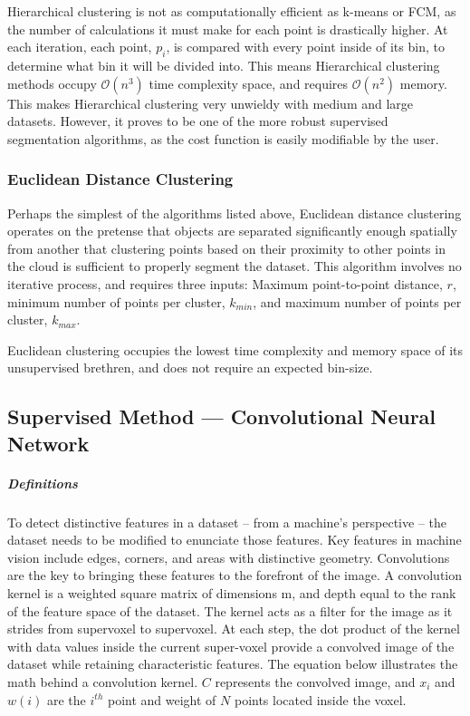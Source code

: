 \documentclass[12pt]{drexelthesis}
\let\Oldsubsection\subsection
\renewcommand{\subsection}{\FloatBarrier\Oldsubsection}
\let\Oldsubsubsection\subsubsection
\renewcommand{\subsubsection}{\FloatBarrier\Oldsubsubsection}
\begin{document}
Hierarchical clustering is not as computationally efficient as k-means or FCM, as the number of calculations it must make for each point is drastically higher. At each iteration, each point, $p_{i}$, is compared with every point inside of its bin, to determine what bin it will be divided into. This means Hierarchical clustering methods occupy $\mathcal{O}(n^{3})$ time complexity space, and requires $\mathcal{O}(n^{2})$ memory. This makes Hierarchical clustering very unwieldy with medium and large datasets. However, it proves to be one of the more robust supervised segmentation algorithms, as the cost function is easily modifiable by the user.


\subsubsection{Euclidean Distance Clustering}
Perhaps the simplest of the algorithms listed above, Euclidean distance clustering operates on the pretense that objects are separated significantly enough spatially from another that clustering points based on their proximity to other points in the cloud is sufficient to properly segment the dataset. This algorithm involves no iterative process, and requires three inputs: Maximum point-to-point distance, $r$, minimum number of points per cluster, $k_{min}$, and maximum number of points per cluster, $k_{max}$.

Euclidean clustering occupies the lowest time complexity and memory space of its unsupervised brethren, and does not require an expected bin-size.



\subsection{Supervised Method --- Convolutional Neural Network}
\subparagraph{Definitions}
To detect distinctive features in a dataset – from a machine’s perspective – the dataset needs to be modified to enunciate those features. Key features in machine vision include edges, corners, and areas with distinctive geometry. Convolutions are the key to bringing these features to the forefront of the image.
A convolution kernel is a weighted square matrix of dimensions m, and depth equal to the rank of the feature space of the dataset. The kernel acts as a filter for the image as it strides from supervoxel to supervoxel. At each step, the dot product of the kernel with data values inside the current super-voxel provide a convolved image of the dataset while retaining characteristic features. The equation below illustrates the math behind a convolution kernel. $C$ represents the convolved image, and $x_{i}$ and $w(i)$ are the $i^{th}$ point and weight of $N$ points located inside the voxel.
\end{document}
